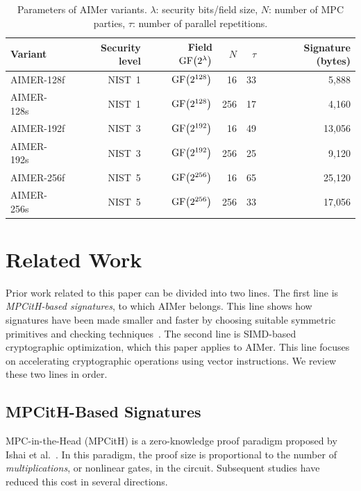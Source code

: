 \begin{table}[h]
\centering
\caption{Parameters of AIMer variants. $\lambda$: security bits/field size, $N$: number of MPC parties,
$\tau$: number of parallel repetitions.}
\label{tab:params}
{\normalsize
\setlength{\tabcolsep}{7pt} %
\renewcommand{\arraystretch}{1.15} %
\begin{tabular}{lrrrrr}
\toprule
Variant & Security level & Field $\operatorname{GF}\bigl(2^{\lambda}\bigr)$ & $N$ & $\tau$ & Signature (bytes) \\
\midrule
AIMER-128f & NIST~1 & $\operatorname{GF}\bigl(2^{128}\bigr)$ & 16  & 33 & 5{,}888 \\
AIMER-128s & NIST~1 & $\operatorname{GF}\bigl(2^{128}\bigr)$ & 256 & 17 & 4{,}160 \\
AIMER-192f & NIST~3 & $\operatorname{GF}\bigl(2^{192}\bigr)$ & 16  & 49 & 13{,}056 \\
AIMER-192s & NIST~3 & $\operatorname{GF}\bigl(2^{192}\bigr)$ & 256 & 25 & 9{,}120 \\
AIMER-256f & NIST~5 & $\operatorname{GF}\bigl(2^{256}\bigr)$ & 16  & 65 & 25{,}120 \\
AIMER-256s & NIST~5 & $\operatorname{GF}\bigl(2^{256}\bigr)$ & 256 & 33 & 17{,}056 \\
\bottomrule
\end{tabular}
}
\end{table}

\section{Related Work}
\label{relatedwork}

Prior work related to this paper can be divided into two lines. The first line is \emph{MPCitH-based signatures}, to which AIMer belongs. This line shows how signatures have been made smaller and faster by choosing suitable symmetric primitives and checking techniques~\cite{lee2023high}. The second line is SIMD-based cryptographic optimization, which this paper applies to AIMer. This line focuses on accelerating cryptographic operations using vector instructions. We review these two lines in order.

\subsection{MPCitH-Based Signatures}

MPC-in-the-Head (MPCitH) is a zero-knowledge proof paradigm proposed by Ishai et al.~\cite{ishai2007zero}. In this paradigm, the proof size is proportional to the number of \emph{multiplications}, or nonlinear gates, in the circuit. Subsequent studies have reduced this cost in several directions.

